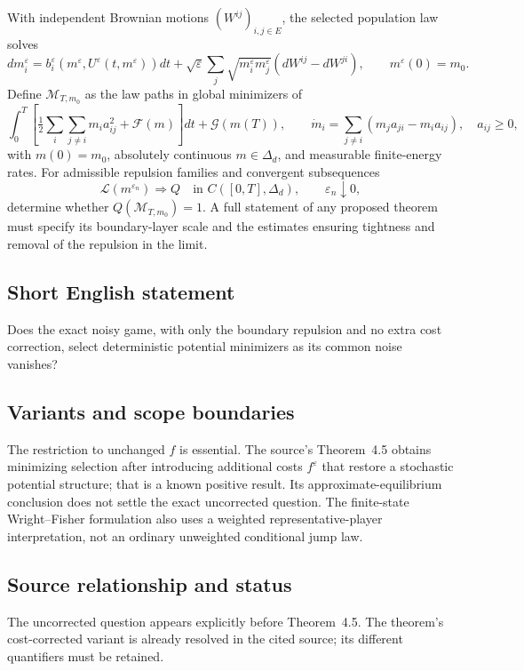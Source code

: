 \documentclass[11pt,a4paper]{article}
\begin{document}
With independent Brownian motions $(W^{ij})_{i,j\in E}$, the selected population law solves
\[
 dm_i^\varepsilon=b_i^\varepsilon(m^\varepsilon,U^\varepsilon(t,m^\varepsilon))dt
 +\sqrt\varepsilon\sum_j\sqrt{m_i^\varepsilon m_j^\varepsilon}(dW^{ij}-dW^{ji}),
 \qquad m^\varepsilon(0)=m_0.
\]
Define $\mathcal M_{T,m_0}$ as the law paths in global minimizers of
\[
 \int_0^T\left[\tfrac12\sum_i\sum_{j\ne i}m_i a_{ij}^2+\mathcal F(m)\right]dt
 +\mathcal G(m(T)),\qquad
 \dot m_i=\sum_{j\ne i}(m_ja_{ji}-m_ia_{ij}),\quad a_{ij}\geq0,
\]
with $m(0)=m_0$, absolutely continuous $m\in\Delta_d$, and measurable finite-energy rates. For admissible repulsion families and convergent subsequences
\[
 \mathcal L(m^{\varepsilon_n})\Longrightarrow Q
 \quad\text{in }C([0,T],\Delta_d),\qquad \varepsilon_n\downarrow0,
\]
determine whether $Q(\mathcal M_{T,m_0})=1$. A full statement of any proposed theorem must specify its boundary-layer scale and the estimates ensuring tightness and removal of the repulsion in the limit.
\subsection*{Short English statement}
Does the exact noisy game, with only the boundary repulsion and no extra cost correction, select deterministic potential minimizers as its common noise vanishes?
\subsection*{Variants and scope boundaries}
The restriction to unchanged $f$ is essential. The source's Theorem~4.5 obtains minimizing selection after introducing additional costs $f^\varepsilon$ that restore a stochastic potential structure; that is a known positive result. Its approximate-equilibrium conclusion does not settle the exact uncorrected question. The finite-state Wright--Fisher formulation also uses a weighted representative-player interpretation, not an ordinary unweighted conditional jump law.
\subsection*{Source relationship and status}
The uncorrected question appears explicitly before Theorem~4.5. The theorem's cost-corrected variant is already resolved in the cited source; its different quantifiers must be retained.
\end{document}
